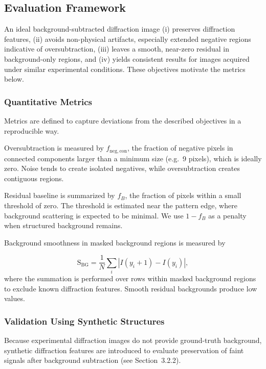 \documentclass[iucr]{iucrjournals}
\begin{document}
\subsection{Evaluation Framework}

An ideal background-subtracted diffraction image (i) preserves diffraction features, (ii) avoids non-physical artifacts, especially extended negative regions indicative of oversubtraction, (iii) leaves a smooth, near-zero residual in background-only regions, and (iv) yields consistent results for images acquired under similar experimental conditions. These objectives motivate the metrics below.


\subsubsection{Quantitative Metrics}

Metrics are defined to capture deviations from the described objectives in a reproducible way.

Oversubtraction is measured by $f_{\mathrm{neg,con}}$, the fraction of negative pixels in connected components larger than a minimum size (e.g.\ 9 pixels), which is ideally zero. Noise tends to create isolated negatives, while oversubtraction creates contiguous regions.

Residual baseline is summarized by $f_B$, the fraction of pixels within a small threshold of zero. The threshold is estimated near the pattern edge, where background scattering is expected to be minimal. We use $1-f_B$ as a penalty when structured background remains.

Background smoothness in masked background regions is measured by

\begin{equation}
\mathrm{S}_{\mathrm{BG}} =
\frac{1}{N} \sum_i \left| I(y_i + 1) - I(y_i) \right|,
\end{equation}
where the summation is performed over rows within masked background regions to exclude known diffraction features. Smooth residual backgrounds produce low values.

\subsubsection{Validation Using Synthetic Structures}

Because experimental diffraction images do not provide ground-truth background, synthetic diffraction features are introduced to evaluate preservation of faint signals after background subtraction (see Section~3.2.2). 
\end{document}
